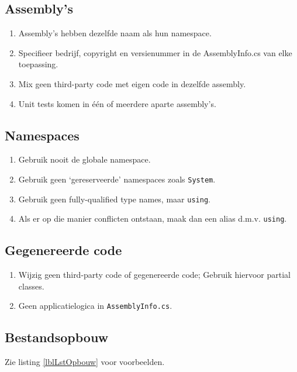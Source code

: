 \documentclass[a4paper,11pt]{article}
\begin{document}
\subsection{Assembly's}

\begin{enumerate}[resume]
\item Assembly's hebben dezelfde naam als hun namespace.
\item Specifieer bedrijf, copyright en versienummer in de AssemblyInfo.cs van
elke toepassing.
\item Mix geen third-party code met eigen code in dezelfde assembly.
\item Unit tests komen in \'e\'en of meerdere aparte
assembly's.
\end{enumerate}

\subsection{Namespaces}

\begin{enumerate}[resume]
\item Gebruik nooit de globale namespace.
\item Gebruik geen `gereserveerde' namespaces zoals \lstinline !System!.
\item Gebruik geen fully-qualified type names, maar \lstinline !using!.
\item Als er op die manier conflicten ontstaan, maak dan een alias d.m.v.
\lstinline !using!.
\end{enumerate}

\subsection{Gegenereerde code}

\begin{enumerate}[resume]
\item Wijzig geen third-party code of gegenereerde code;  Gebruik hiervoor
partial classes.
\item Geen applicatielogica in \lstinline !AssemblyInfo.cs!.
\end{enumerate}

\subsection{Bestandsopbouw}
Zie listing \ref{lblLstOpbouw} voor voorbeelden.
\end{document}
